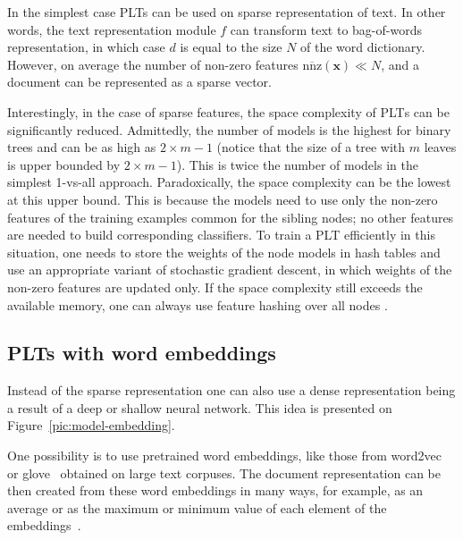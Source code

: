 \documentclass{article}
\newcommand{\Algo}[1]{\textsc{#1}}
\renewcommand{\vec}[1]{\boldsymbol{#1}}
\newcommand{\bx}{\vec{x}}
\newcommand{\sectionBefore}{-0pt}
\newcommand{\sectionAfter}{-0pt}
\begin{document}
{In the simplest case PLTs can be used on sparse representation of text. In other words, the text representation module $f$ can transform text to bag-of-words representation, in which case $d$ is equal to the size $N$ of the word dictionary. However, on average the number of non-zero features $\overline{\mathrm{nnz}}(\bx) \ll N$, and a document can be represented as a sparse vector. 

Interestingly, in the case of sparse features, the space complexity of \Algo{PLT}s can be significantly reduced. Admittedly, the number of models is the highest for binary trees and can be as high as $2\times m-1$ (notice that the size of a tree with $m$ leaves is upper bounded by $2\times m-1$). This is twice the number of models in the simplest 1-vs-all approach. Paradoxically, the space complexity can be the lowest at this upper bound. This is because the models need to use only the non-zero features of the training examples common for the sibling nodes; no other features are needed to build corresponding classifiers. To train a \Algo{PLT} efficiently in this situation, one needs to store the weights of the node models in hash tables and use an appropriate variant of stochastic gradient descent, in which weights of the non-zero features are updated only. If the space complexity still exceeds the available memory, one can always use feature hashing over all nodes \cite{Weinberger_et_al_2009}.


\vspace{\sectionBefore}
\subsection{PLTs with word embeddings}
\label{sec:plt-word_embeddings}
\vspace{\sectionAfter}

Instead of the sparse representation one can also use a dense representation being a result of a deep or shallow neural network. This idea is presented on Figure~\ref{pic:model-embedding}.

One possibility is to use pretrained word embeddings, like those from word2vec~\citep{Mikolov_et_al_2013} or glove~\citep{Pennigton_et_al_2014} obtained on large text corpuses. The document representation can be then created from these word embeddings in many ways, for example, as an average or as the maximum or minimum value of each element of the embeddings~\citep{De_Boom_et_al_2016}.

}
\end{document}

